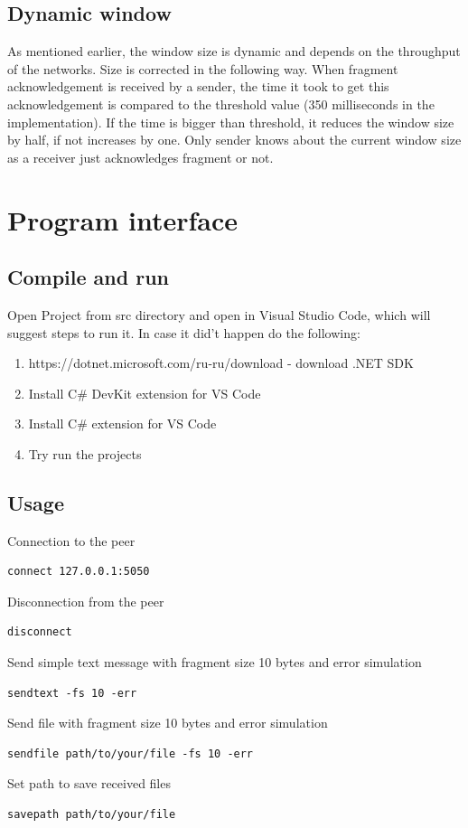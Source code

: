 \documentclass{article}
\begin{document}
\subsection{Dynamic window}
As mentioned earlier, the window size is dynamic and depends on the throughput of the networks.\newline
Size is corrected in the following way. When fragment acknowledgement is received by a sender,   the time it took to get this acknowledgement is compared to the threshold value (350 milliseconds in the implementation). If the time is bigger than threshold, it reduces the window size by half, if not increases by one. Only sender knows about the current window size as a receiver just acknowledges fragment or not. 

\pagebreak

\section{Program interface}
\subsection{Compile and run}

Open Project from src directory and open in Visual Studio Code, which will suggest steps to run it. In case it did't happen do the following:
\begin{enumerate}
\item https://dotnet.microsoft.com/ru-ru/download - download .NET SDK
\item Install C\# DevKit extension for VS Code
\item Install C\# extension for VS Code
\item Try run the projects
\end{enumerate}

\subsection{Usage}
Connection to the peer
\begin{lstlisting}
connect 127.0.0.1:5050
\end{lstlisting}
Disconnection from the peer
\begin{lstlisting}
disconnect
\end{lstlisting}
Send simple text message with fragment size 10 bytes and error simulation
\begin{lstlisting}
sendtext -fs 10 -err
\end{lstlisting}
Send file with fragment size 10 bytes and error simulation
\begin{lstlisting}
sendfile path/to/your/file -fs 10 -err
\end{lstlisting}
Set path to save received files
\begin{lstlisting}
savepath path/to/your/file 
\end{lstlisting}
\newpage
\end{document}
